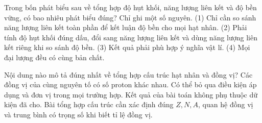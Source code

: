 \begin{ex}
Trong bốn phát biểu sau về tổng hợp độ hụt khối, năng lượng liên kết và độ bền vững, có bao nhiêu phát biểu đúng? Chỉ ghi một số nguyên. (1) Chỉ cần so sánh năng lượng liên kết toàn phần để kết luận độ bền cho mọi hạt nhân. (2) Phải tính độ hụt khối đúng dấu, đổi sang năng lượng liên kết và dùng năng lượng liên kết riêng khi so sánh độ bền. (3) Kết quả phải phù hợp ý nghĩa vật lí. (4) Mọi đại lượng đều có cùng bản chất.
\end{ex}

\begin{ex}
Nội dung nào mô tả đúng nhất về tổng hợp cấu trúc hạt nhân và đồng vị?
\choice
{Các đồng vị của cùng nguyên tố có số proton khác nhau.}
{Có thể bỏ qua điều kiện áp dụng và đơn vị trong mọi trường hợp.}
{Kết quả của bài toán không phụ thuộc dữ kiện đã cho.}
{\True Bài tổng hợp cấu trúc cần xác định đúng $Z,N,A$, quan hệ đồng vị và trung bình có trọng số khi biết tỉ lệ đồng vị.}
\end{ex}

